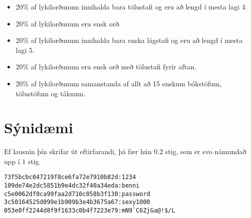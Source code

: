 \begin{itemize}
    \item 20\% af lykilorðunum innihalda bara tölustafi og eru að lengd í mesta lagi 4.
    \item 20\% af lykilorðunum eru ensk orð.
    \item 20\% af lykilorðunum innihalda bara enska lágstafi og eru að lengd í mesta lagi 5.
    \item 20\% af lykilorðunum eru ensk orð með tölustafi fyrir aftan.
    \item 20\% af lykilorðunum samanstanda af allt að 15 enskum bókstöfum, tölustöfum og táknum.
\end{itemize}

\section*{Sýnidæmi}
Ef lausnin þín skrifar út eftirfarandi, þá fær hún $0.2$ stig, sem er svo
námundað upp í $1$ stig.
\begin{verbatim}
73f5bcbc047219f8ce6fa72e7910b82d:1234
109de74e2dc5851b9e4dc32f40a34eda:benni
c5e0062df0ca99faa2d710c058b3f130:password
3c50164525d099e1b909b3e4b3675a67:sexy1000
053e0ff2244d8f9f1633c0b4f7223e79:mN9`C6ZjGa@!$/L
\end{verbatim}

